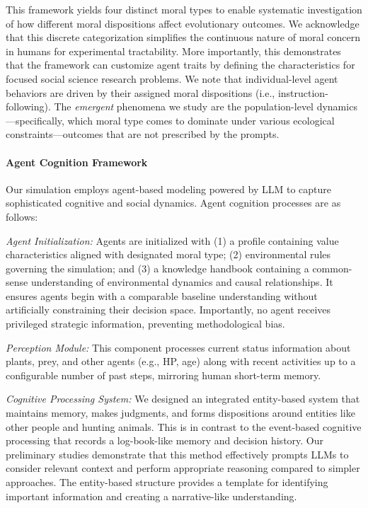 This framework yields four distinct moral types to enable systematic investigation of how different moral dispositions affect evolutionary outcomes. We acknowledge that this discrete categorization simplifies the continuous nature of moral concern in humans for experimental tractability. 
More importantly, this demonstrates that the framework can customize agent traits by defining the characteristics for focused social science research problems. We note that individual-level agent behaviors are driven by their assigned moral dispositions (i.e., instruction-following). The \textit{emergent} phenomena we study are the population-level dynamics---specifically, which moral type comes to dominate under various ecological constraints---outcomes that are not prescribed by the prompts.

\paragraph{Agent Cognition Framework}
Our simulation employs agent-based modeling powered by LLM to capture sophisticated cognitive and social dynamics. Agent cognition processes are as follows: 

\textit{Agent Initialization:} Agents are initialized with (1) a profile containing value characteristics aligned with designated moral type; (2) environmental rules governing the simulation; and (3) a knowledge handbook containing a common-sense understanding of environmental dynamics and causal relationships. It ensures agents begin with a comparable baseline understanding without artificially constraining their decision space. Importantly, no agent receives privileged strategic information, preventing methodological bias.

\textit{Perception Module:} This component processes current status information about plants, prey, and other agents (e.g., HP, age) along with recent activities up to a configurable number of past steps, mirroring human short-term memory.

\textit{Cognitive Processing System:} We designed an integrated entity-based system that maintains memory, makes judgments, and forms dispositions around entities like other people and hunting animals. This is in contrast to the event-based cognitive processing that records a log-book-like memory and decision history.  Our preliminary studies demonstrate that this method effectively prompts LLMs to consider relevant context and perform appropriate reasoning compared to simpler approaches. The entity-based structure provides a template for identifying important information and creating a narrative-like understanding.

